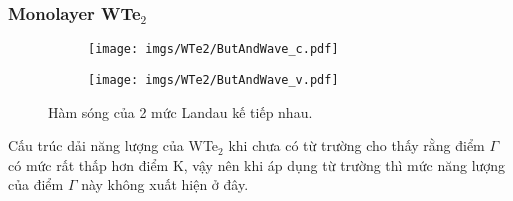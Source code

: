 \documentclass{article}
\begin{document}
\newpage
\subsubsection*{Monolayer WTe$_{2}$}
\begin{figure}[htb]
	\begin{subfigure}{0.495\textwidth}
		\centering
		\texttt{[image: imgs/WTe2/ButAndWave\_c.pdf]}
	\end{subfigure}
	\begin{subfigure}{0.495\textwidth}
		\centering
		\texttt{[image: imgs/WTe2/ButAndWave\_v.pdf]}
	\end{subfigure}
	\caption{Hàm sóng của 2 mức Landau kế tiếp nhau.}
\end{figure}

Cấu trúc dải năng lượng của WTe$_{2}$ khi chưa có từ trường cho thấy rằng điểm $\Gamma$ có mức rất thấp hơn điểm K, vậy nên khi áp dụng từ trường thì mức năng lượng của điểm $\Gamma$ này không xuất hiện ở đây.  
\end{document}
